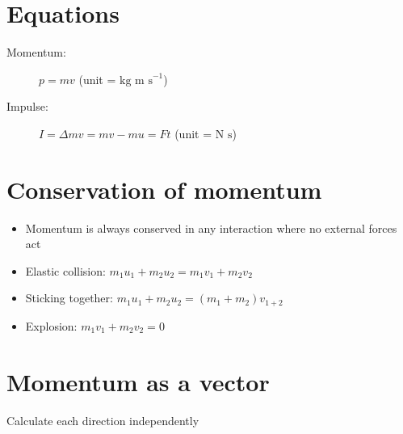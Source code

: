 \section{Equations}
\begin{description}
    \item[Momentum:] $p=mv$ (unit = $\text{kg m s}^{-1}$)
    \item[Impulse:] $I=\Delta mv=mv-mu=Ft$ (unit = $\text{N s}$)
\end{description}

\section{Conservation of momentum}
\begin{itemize}
    \item Momentum is always conserved in any interaction where no external forces act
    \item Elastic collision: $m_1u_1+m_2u_2=m_1v_1+m_2v_2$
    \item Sticking together: $m_1u_1+m_2u_2=(m_1+m_2)v_{1+2}$
    \item Explosion: $m_1v_1+m_2v_2=0$
\end{itemize}

\section{Momentum as a vector}
Calculate each direction independently